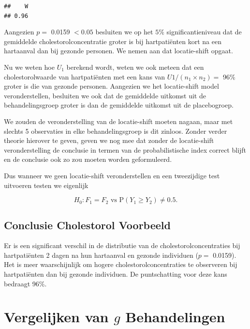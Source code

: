 \documentclass[
  12pt,dutch,coursenotes]{book}
\theoremstyle{definition}
\theoremstyle{definition}
\theoremstyle{definition}
\theoremstyle{definition}
\theoremstyle{remark}
\begin{document}
\begin{lstlisting}
##    W 
## 0.96
\end{lstlisting}

Aangezien \(p=\) 0.0159 \(<0.05\) besluiten we op het \(5\%\) significantieniveau dat de gemiddelde cholestorolconcentratie groter is bij hartpatiënten kort na een hartaanval dan bij gezonde personen. We nemen aan dat locatie-shift opgaat.

Nu we weten hoe \(U_1\) berekend wordt, weten we ook meteen dat een cholestorolwaarde van hartpatiënten met een kans van
\(U1/(n_1\times n_2)=\) 96\%
groter is die van gezonde personen. Aangezien we het locatie-shift model veronderstellen, besluiten we ook dat de gemiddelde uitkomst uit de behandelingsgroep groter is dan de gemiddelde uitkomst uit de placebogroep.

We zouden de veronderstelling van de locatie-shift moeten nagaan, maar met slechts 5 observaties in elke behandelingsgroep is dit zinloos. Zonder verder theorie hierover te geven, geven we nog mee dat zonder de locatie-shift veronderstelling de conclusie in termen van de probabilistische index correct blijft en de conclusie ook zo zou moeten worden geformuleerd.

Dus wanneer we geen locatie-shift veronderstellen en een tweezijdige test uitvoeren testen we eigenlijk

\[H_0: F_1=F_2 \text{ vs P}(Y_1 \geq Y_2) \neq 0.5.\]

\hypertarget{conclusie-cholestorol-voorbeeld}{%
\subsection{Conclusie Cholestorol Voorbeeld}\label{conclusie-cholestorol-voorbeeld}}

Er is een significant verschil in de distributie van de cholestorolconcentraties bij hartpatiënten 2 dagen na hun hartaanval en gezonde individuen (\(p=\) 0.0159). Het is meer waarschijnlijk om hogere cholestorolconcentraties te observeren bij hartpatiënten dan bij gezonde individuen. De puntschatting voor deze kans bedraagt 96\%.

\hypertarget{vergelijken-van-g-behandelingen}{%
\section{\texorpdfstring{Vergelijken van \(g\) Behandelingen}{Vergelijken van g Behandelingen}}\label{vergelijken-van-g-behandelingen}}
\end{document}
